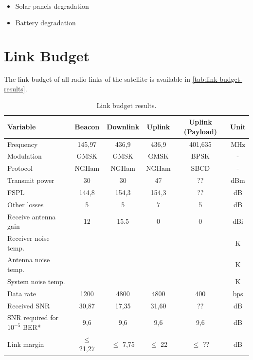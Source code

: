 \begin{itemize}
    \item Solar panels degradation
    \item Battery degradation
\end{itemize}

\section{Link Budget}

The link budget of all radio links of the satellite is available in \autoref{tab:link-budget-results}.

\begin{table}[!h]
    \centering
    \begin{tabular}{L{0.3\textwidth}ccccc}
        \toprule[1.5pt]
        \textbf{Variable} & \textbf{Beacon} & \textbf{Downlink} & \textbf{Uplink} & \textbf{Uplink (Payload)} & \textbf{Unit}\\
        \midrule
        Frequency                       & 145,97    & 436,9     & 436,9     & 401,635   & MHz \\
        Modulation                      & GMSK      & GMSK      & GMSK      & BPSK      & - \\
        Protocol                        & NGHam     & NGHam     & NGHam     & SBCD      & - \\
        Transmit power                  & 30        & 30        & 47        & ??        & dBm \\
        FSPL                            & 144,8     & 154,3     & 154,3     & ??        & dB \\
        Other losses                    & 5         & 5         & 7         & 5         & dB \\
        Receive antenna gain            & 12        & 15.5      & 0         & 0         & dBi \\
        Receiver noise temp.            &           &           &           &           & K \\
        Antenna noise temp.             &           &           &           &           & K \\
        System noise temp.              &           &           &           &           & K \\
        Data rate                       & 1200      & 4800      & 4800      & 400       & bps \\
        Received SNR                    & 30,87     & 17,35     & 31,60     & ??        & dB \\
        SNR required for $10^{-5}$ BER*  & 9,6       & 9,6       & 9,6       & 9,6       & dB \\
        Link margin                     & $\leq$ 21,27 & $\leq$ 7,75 & $\leq$ 22 & $\leq$ ?? & dB \\
        \bottomrule[1.5pt]
    \end{tabular}
    \caption{Link budget results.}
    \label{tab:link-budget-results}
\end{table}

